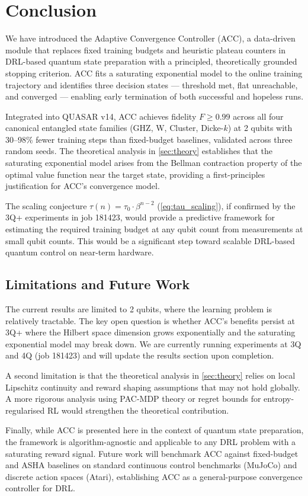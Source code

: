 \section{Conclusion}
\label{sec:conclusion}

We have introduced the Adaptive Convergence Controller (ACC), a data-driven module
that replaces fixed training budgets and heuristic plateau counters in DRL-based
quantum state preparation with a principled, theoretically grounded stopping criterion.
ACC fits a saturating exponential model to the online training trajectory and identifies
three decision states — threshold met, flat unreachable, and converged — enabling
early termination of both successful and hopeless runs.

Integrated into QUASAR v14, ACC achieves fidelity $F \geq 0.99$ across all four
canonical entangled state families (GHZ, W, Cluster, Dicke-$k$) at 2 qubits with
30--98\% fewer training steps than fixed-budget baselines, validated across three
random seeds. The theoretical analysis in \cref{sec:theory} establishes that the
saturating exponential model arises from the Bellman contraction property of the
optimal value function near the target state, providing a first-principles
justification for ACC's convergence model.

The scaling conjecture $\tau(n) = \tau_0 \cdot \beta^{n-2}$ (\cref{eq:tau_scaling}),
if confirmed by the 3Q+ experiments in job 181423, would provide a predictive framework
for estimating the required training budget at any qubit count from measurements at
small qubit counts. This would be a significant step toward scalable DRL-based quantum
control on near-term hardware.

\subsection{Limitations and Future Work}

The current results are limited to 2 qubits, where the learning problem is relatively
tractable. The key open question is whether ACC's benefits persist at 3Q+ where the
Hilbert space dimension grows exponentially and the saturating exponential model may
break down. We are currently running experiments at 3Q and 4Q (job 181423) and will
update the results section upon completion.

A second limitation is that the theoretical analysis in \cref{sec:theory} relies on
local Lipschitz continuity and reward shaping assumptions that may not hold globally.
A more rigorous analysis using PAC-MDP theory \cite{kakade2003sample} or regret bounds
for entropy-regularised RL \cite{haarnoja2018soft} would strengthen the theoretical
contribution.

Finally, while ACC is presented here in the context of quantum state preparation, the
framework is algorithm-agnostic and applicable to any DRL problem with a saturating
reward signal. Future work will benchmark ACC against fixed-budget and ASHA baselines
on standard continuous control benchmarks (MuJoCo) and discrete action spaces (Atari),
establishing ACC as a general-purpose convergence controller for DRL.
